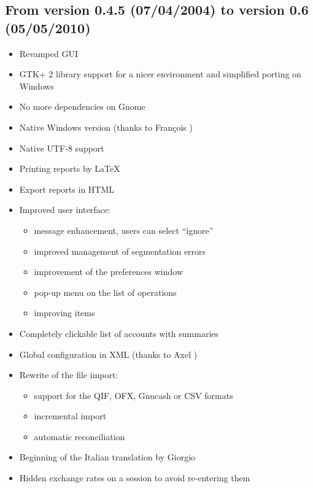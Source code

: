 \subsection{From version 0.4.5 \textnormal{(07/04/2004)} to version 0.6 \textnormal{(05/05/2010)}}

\begin{itemize}
	\item Revamped GUI
	\item \gls{GTK}+ 2 library support for a nicer environment and simplified porting on Windows
	\item No more dependencies on \gls{Gnome}
	\item Native Windows version (thanks to François )
	\item Native \gls{UTF-8} support 
	\item Printing reports by \gls{LaTeX}
	\item Export reports in \gls{HTML}
	\item Improved user interface:
		\begin{itemize}
			\item[\textopenbullet] message enhancement, users can select ``ignore''
			\item[\textopenbullet] improved management of segmentation errors
			\item[\textopenbullet] improvement of the preferences window
			\item[\textopenbullet] pop-up menu on the list of operations
			\item[\textopenbullet] improving items
		\end{itemize}
	\item Completely clickable list of accounts with summaries
	\item Global configuration in \gls{XML} (thanks to Axel )
	\item Rewrite of the file import:
		\begin{itemize}
			\item[\textopenbullet] support for the \gls{QIF}, \gls{OFX}, \gls{Gnucash} or \gls{CSV}  formats
			\item[\textopenbullet] incremental import
			\item[\textopenbullet] automatic reconciliation
		\end{itemize}
	\item Beginning of the Italian translation by Giorgio 
	\item Hidden exchange rates on a session to avoid re-entering them

\end{itemize}
